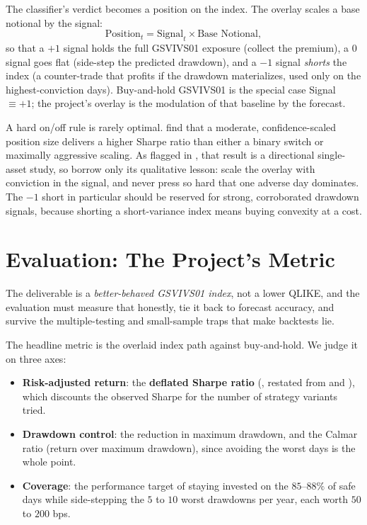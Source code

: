 The classifier's verdict becomes a position on the index. The overlay scales a base notional by the signal:
\begin{equation}
\label{eq:gsvivs:position}
\text{Position}_t = \text{Signal}_t \times \text{Base Notional},
\end{equation}
so that a $+1$ signal holds the full GSVIVS01 exposure (collect the premium), a $0$ signal goes flat (side-step the predicted drawdown), and a $-1$ signal \emph{shorts} the index (a counter-trade that profits if the drawdown materializes, used only on the highest-conviction days). Buy-and-hold GSVIVS01 is the special case Signal $\equiv +1$; the project's overlay is the modulation of that baseline by the forecast.

\begin{warning}
A hard on/off rule is rarely optimal. \citet{LiWu2026} find that a moderate, confidence-scaled position size delivers a higher Sharpe ratio than either a binary switch or maximally aggressive scaling. As flagged in , that result is a directional single-asset study, so borrow only its qualitative lesson: scale the overlay with conviction in the signal, and never press so hard that one adverse day dominates. The $-1$ short in particular should be reserved for strong, corroborated drawdown signals, because shorting a short-variance index means buying convexity at a cost.
\end{warning}

\section{Evaluation: The Project's Metric}
\label{sec:gsvivs:evaluation}

The deliverable is a \emph{better-behaved GSVIVS01 index}, not a lower QLIKE, and the evaluation must measure that honestly, tie it back to forecast accuracy, and survive the multiple-testing and small-sample traps that make backtests lie.

The headline metric is the overlaid index path against buy-and-hold. We judge it on three axes:
\begin{itemize}
  \item \textbf{Risk-adjusted return}: the \textbf{deflated Sharpe ratio} (, restated from  and ), which discounts the observed Sharpe for the number of strategy variants tried.
  \item \textbf{Drawdown control}: the reduction in maximum drawdown, and the Calmar ratio (return over maximum drawdown), since avoiding the worst days is the whole point.
  \item \textbf{Coverage}: the performance target of staying invested on the $85$--$88\%$ of safe days while side-stepping the $5$ to $10$ worst drawdowns per year, each worth $50$ to $200$ bps.
\end{itemize}

